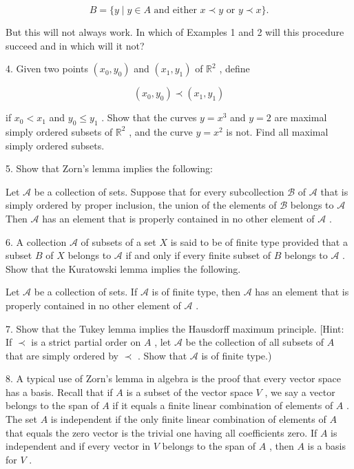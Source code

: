 \[
B = \{ y \mid  y \in  A\text{ and either }x \prec  y\text{ or }y \prec  x\} .
\]

But this will not always work. In which of Examples 1 and 2 will this procedure succeed and in which will it not?

4. Given two points \(\left( {{x}_{0},{y}_{0}}\right)\) and \(\left( {{x}_{1},{y}_{1}}\right)\) of \({\mathbb{R}}^{2}\) , define

\[
\left( {{x}_{0},{y}_{0}}\right)  \prec  \left( {{x}_{1},{y}_{1}}\right)
\]

if \({x}_{0} < {x}_{1}\) and \({y}_{0} \leq  {y}_{1}\) . Show that the curves \(y = {x}^{3}\) and \(y = 2\) are maximal simply ordered subsets of \({\mathbb{R}}^{2}\) , and the curve \(y = {x}^{2}\) is not. Find all maximal simply ordered subsets.

5. Show that Zorn's lemma implies the following:

\begin{lemma}[Kuratowski] Let \(\mathcal{A}\) be a collection of sets. Suppose that for every subcollection \(\mathcal{B}\) of \(\mathcal{A}\) that is simply ordered by proper inclusion, the union of the elements of \(\mathcal{B}\) belongs to \(\mathcal{A}\) Then \(\mathcal{A}\) has an element that is properly contained in no other element of \(\mathcal{A}\) .
\end{lemma}

6. A collection \(\mathcal{A}\) of subsets of a set \(X\) is said to be of finite type provided that a subset \(B\) of \(X\) belongs to \(\mathcal{A}\) if and only if every finite subset of \(B\) belongs to \(\mathcal{A}\) . Show that the Kuratowski lemma implies the following.

\begin{lemma}[Tukey, 1940] Let \(\mathcal{A}\) be a collection of sets. If \(\mathcal{A}\) is of finite type, then \(\mathcal{A}\) has an element that is properly contained in no other element of \(\mathcal{A}\) .
\end{lemma}

7. Show that the Tukey lemma implies the Hausdorff maximum principle. [Hint: If \(\prec\) is a strict partial order on \(A\) , let \(\mathcal{A}\) be the collection of all subsets of \(A\) that are simply ordered by \(\prec\) . Show that \(\mathcal{A}\) is of finite type.)

8. A typical use of Zorn's lemma in algebra is the proof that every vector space has a basis. Recall that if \(A\) is a subset of the vector space \(V\) , we say a vector belongs to the span of \(A\) if it equals a finite linear combination of elements of \(A\) . The set \(A\) is independent if the only finite linear combination of elements of \(A\) that equals the zero vector is the trivial one having all coefficients zero. If \(A\) is independent and if every vector in \(V\) belongs to the span of \(A\) , then \(A\) is a basis for \(V\) .

